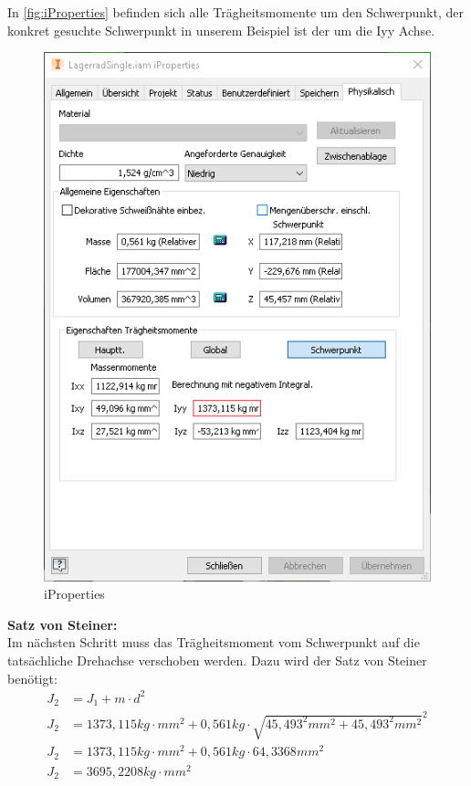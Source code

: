 In \autoref{fig:iProperties} befinden sich alle Trägheitsmomente um den Schwerpunkt, der konkret gesuchte Schwerpunkt in unserem Beispiel ist
der um die Iyy Achse.

\begin{figure}[H]
    \centering
    \includegraphics[scale=1,page=1]{fig/mech/iProberties.png}
    \caption{iProperties}
    \label{fig:iProperties}
\end{figure}

\textbf{Satz von Steiner:}\\
Im nächsten Schritt muss das Trägheitsmoment vom Schwerpunkt auf die tatsächliche Drehachse verschoben werden.
Dazu wird der Satz von Steiner benötigt:\\
\begin{align*}
    J_{2} &= J_{1}+m\cdot d^{2} \\
    J_{2} &= 1373,115 kg\cdot mm^{2}+0,561kg\cdot \sqrt{45,493^{2}mm^{2}+45,493^{2}mm^{2}}^{2} \\
    J_{2} &= 1373,115 kg\cdot mm^{2}+0,561kg\cdot 64,3368mm^{2} \\
    J_{2} &= 3695,2208 kg\cdot mm^{2} \\
\end{align*}

